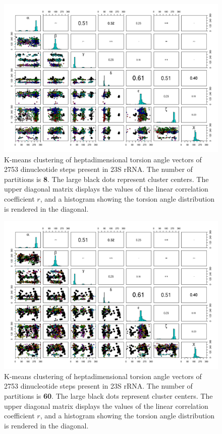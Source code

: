 \begin{figure}
 \centering
 \includegraphics[angle=90, scale=0.50]{hartigan_k8_b.png}
 \caption{K-means clustering of  heptadimensional torsion angle vectors
of  2753  dinucleotide  steps  present  in 23S  rRNA.  The  number  of
partitions  is  \textbf{8}.  The  large  black  dots  represent cluster
centers. The upper diagonal matrix displays the values of the linear
correlation coefficient $r$, and a histogram showing the torsion angle
distribution is rendered in the diagonal.}
 \label{fig:k8}
 \end{figure}
 
\begin{figure}[htbp]
 \centering
 \includegraphics[angle=90, scale=0.50]{hartigan_k60_b.png}
 \caption{K-means clustering of  heptadimensional torsion angle vectors
of  2753  dinucleotide  steps  present  in 23S  rRNA.  The  number  of
partitions  is  \textbf{60}.  The  large  black  dots represent cluster
centers. The upper diagonal matrix displays the values of the linear
correlation coefficient $r$, and a histogram showing the torsion angle
distribution is rendered in the diagonal.}
 \label{fig:k60}
 \end{figure}

